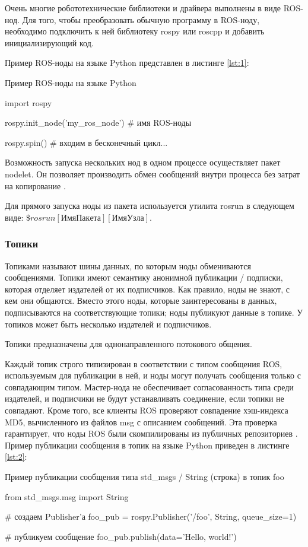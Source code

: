 Очень многие робототехнические библиотеки и драйвера выполнены в виде ROS-нод.
Для того, чтобы преобразовать обычную программу в ROS-ноду, необходимо подключить к ней библиотеку rospy или roscpp и добавить инициализирующий код.

Пример ROS-ноды на языке Python представлен в листинге \ref{lst:1}:

\begin{Program}[H]
	\caption{Пример ROS-ноды на языке Python} \label{lst:1}
\begin{MyCode}
	import rospy
	
	rospy.init_node('my_ros_node')  # имя ROS-ноды
	
	rospy.spin()  # входим в бесконечный цикл...
\end{MyCode}
\end{Program}

Возможность запуска нескольких нод в одном процессе осуществляет пакет nodelet. Он позволяет производить обмен сообщений внутри процесса без затрат на копирование \cite{ros}.

Для прямого запуска ноды из пакета используется утилита rosrun в следующем виде: \(\$ rosrun [ИмяПакета] [ИмяУзла]\).

\subsubsection{Топики}
Топиками называют шины данных, по которым ноды обмениваются сообщениями. Топики имеют семантику анонимной публикации / подписки, которая отделяет издателей от их подписчиков. Как правило, ноды не знают, с кем они общаются. Вместо этого ноды, которые заинтересованы в данных, подписываются на соответствующие топики; ноды публикуют данные в топике. У топиков может быть несколько издателей и подписчиков.

Топики предназначены для однонаправленного потокового общения.

Каждый топик строго типизирован в соответствии с типом сообщения ROS, используемым для публикации в ней, и ноды могут получать сообщения только с совпадающим типом. Мастер-нода не обеспечивает согласованность типа среди издателей, и подписчики не будут устанавливать соединение, если топики не совпадают. Кроме того, все клиенты ROS проверяют совпадение хэш-индекса MD5, вычисленного из файлов msg с описанием сообщений. Эта проверка гарантирует, что ноды ROS были скомпилированы из публичных репозиториев \cite{ros}. Пример публикации сообщения в топик на языке Python приведен в листинге \ref{lst:2}:
\begin{Program}[H]
	\caption{Пример публикации сообщения типа std\_msgs / String (строка) в топик foo} \label{lst:2}
\begin{MyCode}
	from std_msgs.msg import String
	
	# создаем Publisher'а
	foo_pub = rospy.Publisher('/foo', String, queue_size=1)
	
	# публикуем сообщение
	foo_pub.publish(data='Hello, world!')
\end{MyCode}
\end{Program}


